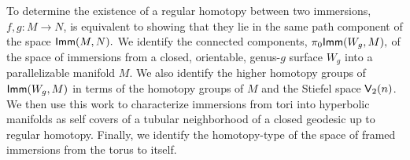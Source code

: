\begin{singlespaced}
To determine the existence of a regular homotopy between two immersions, $f, g: M \rightarrow N$, is equivalent to showing that they lie in the same path component of the space ${\sf Imm}(M, N).$ We identify the connected components, $\pi_{0}{\sf Imm}(W_{g}, M),$ of the space of immersions from a closed, orientable, genus-$g$ surface $W_{g}$ into a parallelizable manifold $M$. We also identify the higher homotopy groups of ${\sf Imm}(W_{g}, M)$ in terms of the homotopy groups of $M$ and the Stiefel space $\mathsf V_{2}(n)$. We then use this work to characterize immersions from tori into hyperbolic manifolds as self covers of a tubular neighborhood of a closed geodesic up to regular homotopy. Finally, we identify the homotopy-type of the space of framed immersions from the torus to itself. 
\end{singlespaced}
